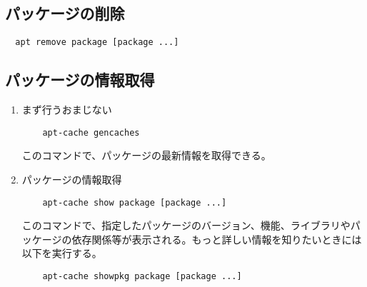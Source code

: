 \documentclass{jreport}
\begin{document}
\subsection{パッケージの削除}

\begin{screen}
\begin{verbatim}
  apt remove package [package ...]
\end{verbatim}
\end{screen}


\subsection{パッケージの情報取得}

\begin{enumerate}
\item まず行うおまじない
  \begin{screen}
  \begin{verbatim}
    apt-cache gencaches
  \end{verbatim}
  \end{screen}
  このコマンドで、パッケージの最新情報を取得できる。
\item パッケージの情報取得
  \begin{screen}
  \begin{verbatim}
    apt-cache show package [package ...]
  \end{verbatim}
  \end{screen}
  このコマンドで、指定したパッケージのバージョン、機能、ライブラリやパッケージの依存関係等が表示される。もっと詳しい情報を知りたいときには以下を実行する。
  \begin{screen}
  \begin{verbatim}
    apt-cache showpkg package [package ...]
  \end{verbatim}
  \end{screen}
\end{enumerate}
\end{document}
